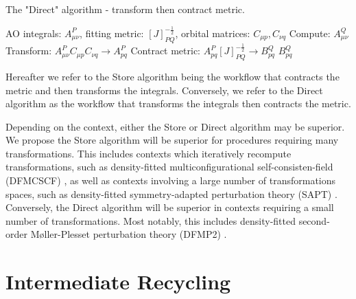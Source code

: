 \begin{algorithm}[H]
\caption{The "Direct" algorithm - transform then contract metric.}
\begin{algorithmic}
\REQUIRE AO integrals: $A_{\mu \nu}^P$, fitting metric: $[J]_{PQ}^{-\frac{1}{2}}$, orbital matrices: $C_{\mu p}, C_{\nu q}$
\STATE Compute: $A_{\mu \nu}^Q$
    \STATE Transform: $A_{\mu \nu}^PC_{\mu p}C_{\nu q} \rightarrow A_{p q}^P$
    \STATE Contract metric: $A_{p q}^P [J]_{PQ}^{-\frac{1}{2}} \rightarrow B_{p q}^Q$
\ENDFOR
\RETURN $B_{p q}^Q$
\end{algorithmic}
\end{algorithm}

\noindent Hereafter we refer to the Store algorithm being the workflow that contracts the metric and then transforms the integrals. Conversely, 
we refer to the Direct algorithm as the workflow that transforms the integrals then contracts the metric. 

Depending on the context, either the Store or Direct algorithm may be superior. We propose the Store algorithm 
will be superior for procedures requiring
many transformations. This includes contexts which iteratively recompute transformations, such as density-fitted multiconfigurational self-consisten-field (DFMCSCF) \cite{??}, 
as well as contexts 
involving a large number of transformations spaces, such as density-fitted symmetry-adapted perturbation theory (SAPT) \cite{ref6} \cite{ref7}. 
Conversely, the Direct algorithm will be superior in contexts requiring a small number of transformations. Most notably, 
this includes density-fitted second-order M{\o}ller-Plesset perturbation theory (DFMP2) \cite{ref4}.

%

\section{Intermediate Recycling}

